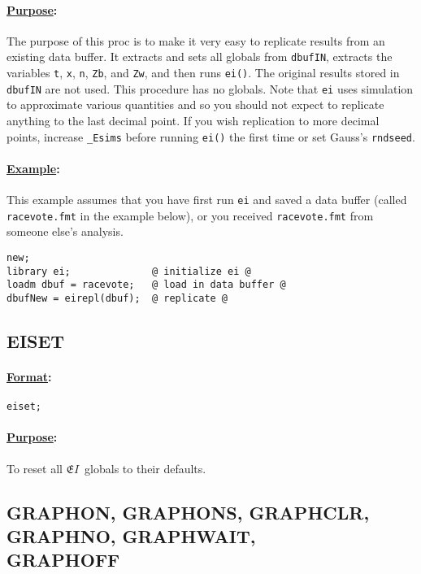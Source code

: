 \documentclass[11pt,titlepage]{article}
\newcommand{\EI}{\ensuremath{{\mathfrak EI}}}
\begin{document}
\paragraph{\underline{Purpose}:}
The purpose of this proc is to make it very easy to replicate results
from an existing data buffer.  It extracts and sets all globals from
\texttt{dbufIN}, extracts the variables \texttt{t}, \texttt{x},
\texttt{n}, \texttt{Zb}, and \texttt{Zw}, and then runs \texttt{ei()}.
The original results stored in \texttt{dbufIN} are not used.  This
procedure has no globals.  Note that \texttt{ei} uses simulation to
approximate various quantities and so you should not expect to
replicate anything to the last decimal point.  If you wish replication
to more decimal points, increase \texttt{\_Esims} before running
\texttt{ei()} the first time or set Gauss's \texttt{rndseed}.

\paragraph{\underline{Example}:}
This example assumes that you have first run \texttt{ei} and saved a
data buffer (called \texttt{racevote.fmt} in the example below), or
you received \texttt{racevote.fmt} from someone else's analysis.
\begin{verbatim}
new;
library ei;              @ initialize ei @
loadm dbuf = racevote;   @ load in data buffer @
dbufNew = eirepl(dbuf);  @ replicate @
\end{verbatim}

\subsection{EISET}

\paragraph{\underline{Format}:} \texttt{eiset;}

\paragraph{\underline{Purpose}:}
To reset all \EI\ globals to their defaults.

\subsection{GRAPHON, GRAPHONS, GRAPHCLR, GRAPHNO, GRAPHWAIT,\\
GRAPHOFF}
 \label{graph}
\end{document}

